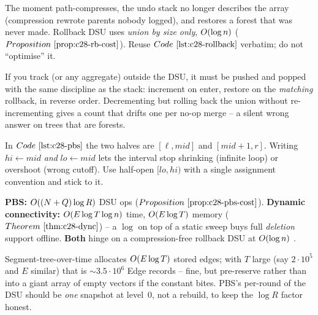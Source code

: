 \begin{warningbox}
The moment  path-compresses, the undo stack no longer describes the
array (compression rewrote parents nobody logged), and  restores
a forest that was never made.  Rollback DSU uses \emph{union by size only},
\(O(\log n)\)  (\(\propref{c28-rb-cost}\)).  Reuse
\(\coderef{c28-rollback}\) verbatim; do not ``optimise'' it.
\end{warningbox}

\begin{warningbox}
If you track  (or any aggregate) outside the DSU, it must be pushed
and popped with the same discipline as the stack: increment on enter, restore on
the \emph{matching} rollback, in reverse order.  Decrementing  but
rolling back the union without re-incrementing gives a count that drifts one per
no-op merge -- a silent wrong answer on trees that are forests.
\end{warningbox}

\begin{warningbox}
In \(\coderef{c28-pbs}\) the two halves are \([\ell,\mathit{mid}]\) and
\([\mathit{mid}+1,r]\).  Writing \(\mathit{hi}\leftarrow\mathit{mid}\) \emph{and}
\(\mathit{lo}\leftarrow\mathit{mid}\) lets the interval stop shrinking (infinite
loop) or overshoot (wrong cutoff).  Use half-open \([\mathit{lo},\mathit{hi})\)
with a single assignment convention and stick to it.
\end{warningbox}

\begin{complexitybox}[Section 17.5]
\textbf{PBS:} \(O((N+Q)\log R)\) DSU ops (\(\propref{c28-pbs-cost}\)).
\textbf{Dynamic connectivity:} \(O(E\log T\log n)\) time, \(O(E\log T)\)
memory (\(\thmref{c28-dync}\)) -- a \(\log\) on top of a static sweep buys full
\emph{deletion} support offline.  \textbf{Both} hinge on a compression-free
rollback DSU at \(O(\log n)\) .
\end{complexitybox}

\begin{hardeningbox}
Segment-tree-over-time allocates \(O(E\log T)\) stored edges; with
\(T\) large (say \(2\cdot10^5\) and \(E\) similar) that is \(\sim
3.5\cdot10^6\) Edge records -- fine, but pre-reserve rather than 
into a giant array of empty vectors if the constant bites.  PBS's per-round
 of the DSU should be \emph{one} snapshot at level~0, not a rebuild,
to keep the \(\log R\) factor honest.
\end{hardeningbox}

